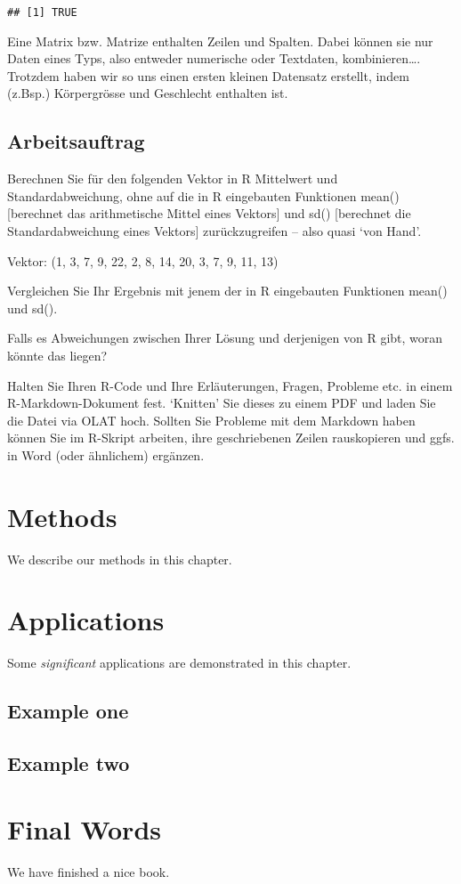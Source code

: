 \documentclass[
]{book}
\begin{document}
\begin{verbatim}
## [1] TRUE
\end{verbatim}

Eine Matrix bzw. Matrize enthalten Zeilen und Spalten. Dabei können sie nur Daten eines Typs, also entweder numerische oder Textdaten, kombinieren\ldots. Trotzdem haben wir so uns einen ersten kleinen Datensatz erstellt, indem (z.Bsp.) Körpergrösse und Geschlecht enthalten ist.

\hypertarget{arbeitsauftrag}{%
\section{Arbeitsauftrag}\label{arbeitsauftrag}}

Berechnen Sie für den folgenden Vektor in R Mittelwert und Standardabweichung, ohne auf die in R eingebauten Funktionen mean() {[}berechnet das arithmetische Mittel eines Vektors{]} und sd() {[}berechnet die Standardabweichung eines Vektors{]} zurückzugreifen -- also quasi `von Hand'.

Vektor: (1, 3, 7, 9, 22, 2, 8, 14, 20, 3, 7, 9, 11, 13)

Vergleichen Sie Ihr Ergebnis mit jenem der in R eingebauten Funktionen mean() und sd().

Falls es Abweichungen zwischen Ihrer Lösung und derjenigen von R gibt, woran könnte das liegen?

Halten Sie Ihren R-Code und Ihre Erläuterungen, Fragen, Probleme etc. in einem R-Markdown-Dokument fest. `Knitten' Sie dieses zu einem PDF und laden Sie die Datei via OLAT hoch. Sollten Sie Probleme mit dem Markdown haben können Sie im R-Skript arbeiten, ihre geschriebenen Zeilen rauskopieren und ggfs. in Word (oder ähnlichem) ergänzen.

\hypertarget{methods}{%
\chapter{Methods}\label{methods}}

We describe our methods in this chapter.

\hypertarget{applications}{%
\chapter{Applications}\label{applications}}

Some \emph{significant} applications are demonstrated in this chapter.

\hypertarget{example-one}{%
\section{Example one}\label{example-one}}

\hypertarget{example-two}{%
\section{Example two}\label{example-two}}

\hypertarget{final-words}{%
\chapter{Final Words}\label{final-words}}

We have finished a nice book.

  
\end{document}
